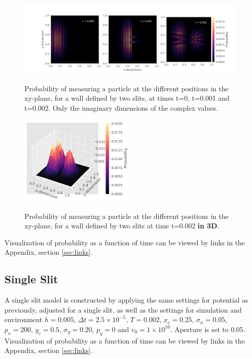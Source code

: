 \documentclass[10pt, nofootinbib, twocolumn]{revtex4-1}
\begin{document}
\begin{figure}
    \caption{Probability of measuring a particle at the different positions in the xy-plane, for a wall defined by two slits, at times t=0, t=0.001 and t=0.002. Only the imaginary dimensions of the complex values.}
    \centering
    \includegraphics[width = 1\textwidth]{figures/plots_imag.pdf} 
    \label{fig:doubleprobim}
\end{figure} 


\begin{figure}[H]
    \caption{Probability of measuring a particle at the different positions in the xy-plane, for a wall defined by two slits at time t=0.002 \textbf{in 3D}.}
    \centering
    \includegraphics[width = 0.5\textwidth]{figures/plot_both_3d.pdf} 
    \label{fig:doubleprob3D}
\end{figure} 

Visualization of probability as a function of time can be viewed by links in the Appendix, section \ref{sec:links}.



\subsection{Single Slit}
A single slit model is constructed by applying the same settings for potential as previously, adjusted for a single slit, as well as the settings for simulation and environment $h = 0.005$, $\Delta t = 2.5\times10^{-5}$, $T = 0.002$, $x_c = 0.25$, $\sigma_x = 0.05$, $p_x = 200$, $y_c = 0.5$, $\sigma_y = 0.20$, $p_y = 0$ and $v_0 = 1\times10^{10}$. Aperture is set to 0.05. Visualization of probability as a function of time can be viewed by links in the Appendix, section \ref{sec:links}.
\end{document}
